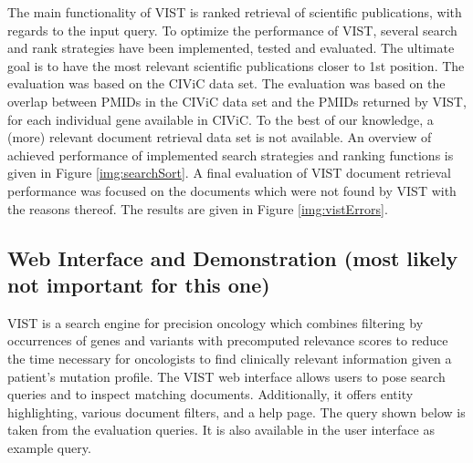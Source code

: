 \documentclass[fleqn,10pt]{wlscirep}
\begin{document}
The main functionality of VIST is ranked retrieval of scientific publications, with regards to the input query. To optimize the performance of VIST, several search and rank strategies have been implemented, tested and evaluated. The ultimate goal is to have the most relevant scientific publications closer to 1st position.  The evaluation was based on the CIViC data set. The evaluation was based on the overlap between PMIDs in the CIViC data set and the PMIDs returned by VIST, for each individual gene available in CIViC. To the best of our knowledge, a (more) relevant document retrieval data set is not available. An overview of achieved performance of implemented search strategies and ranking functions is given in Figure \ref{img:searchSort}.  
A final evaluation of VIST document retrieval performance was focused on the documents which were not found by VIST with the reasons thereof. The results are given in Figure \ref{img:vistErrors}.

\subsection*{Web Interface and Demonstration (most likely not important for this one)}
VIST is a search engine for precision oncology which combines filtering by occurrences of genes and variants with precomputed relevance scores to reduce the time necessary for oncologists to find clinically relevant information given a patient’s mutation profile. The VIST web interface allows users to pose search queries and to inspect matching documents. Additionally, it offers entity highlighting, various document filters, and a help page. The query shown below is taken from the evaluation queries. It is also available in the user interface as example query.
\end{document}
